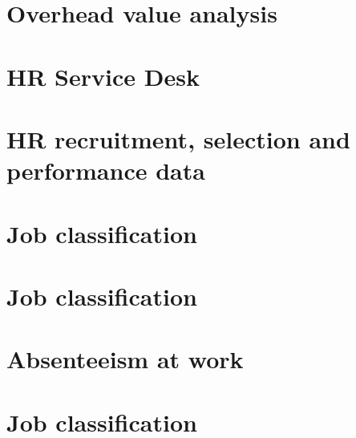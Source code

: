 \documentclass[
  12pt, krantz2,
]{krantz}
\begin{document}
\hypertarget{overhead}{%
\section{Overhead value analysis}\label{overhead}}

\hypertarget{service_desk_data}{%
\section{HR Service Desk}\label{service_desk_data}}

\hypertarget{HRrecruitment}{%
\section{HR recruitment, selection and performance data}\label{HRrecruitment}}

\hypertarget{job-classification-1}{%
\section{Job classification}\label{job-classification-1}}

\hypertarget{job-classification-2}{%
\section{Job classification}\label{job-classification-2}}

\hypertarget{absenteeism-at-work}{%
\section{Absenteeism at work}\label{absenteeism-at-work}}

\hypertarget{job-classification-3}{%
\section{Job classification}\label{job-classification-3}}

  

\backmatter
\printindex
\end{document}
